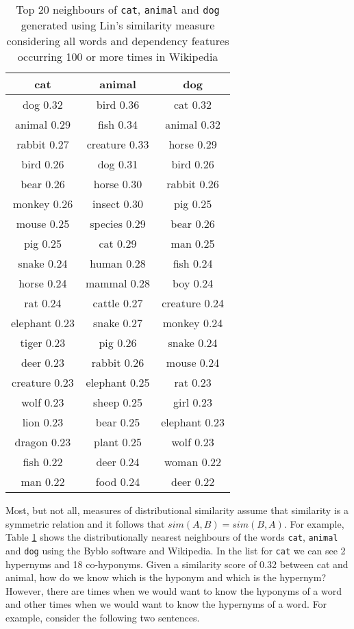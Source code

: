 \documentclass[11pt]{article}
\begin{document}
\begin{table}[ht]
\begin{tabular}{|c|c|c|}
\hline
cat&animal&dog\\
\hline
dog 0.32&bird 0.36&cat 0.32\\
animal 0.29&fish 0.34&animal 0.32\\
rabbit 0.27&creature 0.33&horse 0.29\\
bird 0.26&dog 0.31&bird 0.26\\
bear 0.26&horse 0.30&rabbit 0.26\\
monkey 0.26&insect 0.30&pig 0.25\\
mouse 0.25&species 0.29&bear 0.26\\
pig 0.25&cat 0.29&man 0.25\\
snake 0.24&human 0.28&fish 0.24\\
horse 0.24&mammal 0.28&boy 0.24\\
rat 0.24&cattle 0.27&creature 0.24\\
elephant 0.23&snake 0.27&monkey 0.24\\
tiger 0.23&pig 0.26&snake 0.24\\
deer 0.23&rabbit 0.26&mouse 0.24\\
creature 0.23&elephant 0.25&rat 0.23\\
wolf 0.23&sheep 0.25&girl 0.23\\
lion 0.23&bear 0.25&elephant 0.23\\
dragon 0.23&plant 0.25&wolf 0.23\\
fish 0.22&deer 0.24&woman 0.22\\
man 0.22&food 0.24&deer 0.22\\
\hline
\end{tabular}
\label{table:neighbours}
\caption{Top 20 neighbours of \texttt{cat}, \texttt{animal} and \texttt{dog} generated using Lin's similarity measure \cite{Lin1998} considering all words and dependency features occurring 100 or more times in Wikipedia}
\end{table}
Most, but not all, measures of distributional similarity assume that similarity is a symmetric relation and it follows that $sim(A,B) = sim(B,A)$.  For example, Table \ref{table:neighbours} shows the distributionally nearest neighbours of the words \texttt{cat}, \texttt{animal} and \texttt{dog} using the Byblo software and Wikipedia.  In the list for \texttt{cat} we can see 2 hypernyms and 18 co-hyponyms.  Given a similarity score of 0.32 between cat and animal, how do we know which is the hyponym and which is the hypernym? However, there are times when we would want to know the hyponyms of a word and other times when we would want to know the hypernyms of a word.  For example, consider the following two sentences.
\end{document}
